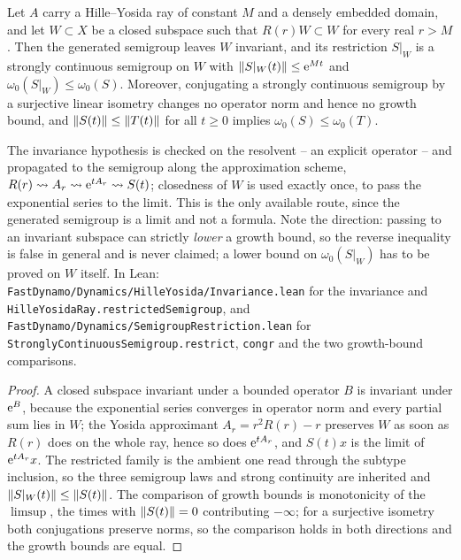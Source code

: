 \begin{lemma}
  \label{lem:dynamics:invariant-restriction}
  \leanok
  Let $A $ carry a Hille--Yosida ray of constant $M $ and a densely embedded domain, and let
  $W\subset X $ be a closed subspace such that $R(r)W\subset W $ for every real $r>M $.  Then
  the generated semigroup leaves $W $ invariant, and its restriction $S|_W $ is a strongly
  continuous semigroup on $W $ with $\left\|S|_W(t)\right\|\leq\mathrm{e}^{Mt} $ and
  $\omega_0(S|_W)\leq\omega_0(S) $.  Moreover, conjugating a strongly continuous semigroup by
  a surjective linear isometry changes no operator norm and hence no growth bound, and
  $\left\|S(t)\right\|\leq\left\|T(t)\right\| $ for all $t\geq0 $ implies $\omega_0(S)\leq\omega_0(T) $.
\end{lemma}

The invariance hypothesis is checked on the resolvent -- an explicit operator -- and
propagated to the semigroup along the approximation scheme,
$R(r)\rightsquigarrow A_r\rightsquigarrow\mathrm{e}^{tA_r}\rightsquigarrow S(t) $; closedness of $W $
is used exactly once, to pass the exponential series to the limit.  This is the only
available route, since the generated semigroup is a limit and not a formula.  Note the
direction: passing to an invariant subspace can strictly \emph{lower} a growth bound, so the
reverse inequality is false in general and is never claimed; a lower bound on
$\omega_0(S|_W) $ has to be proved on $W $ itself.  In Lean:
\texttt{FastDynamo/Dynamics/HilleYosida/Invariance.lean} for the invariance and
\texttt{HilleYosidaRay.restrictedSemigroup}, and
\texttt{FastDynamo/Dynamics/SemigroupRestriction.lean} for
\texttt{StronglyContinuousSemigroup.restrict}, \texttt{congr} and the two growth-bound
comparisons.

\begin{proof}
  \leanok
  A closed subspace invariant under a bounded operator $B $ is invariant under $\mathrm{e}^B $,
  because the exponential series converges in operator norm and every partial sum lies in
  $W $; the Yosida approximant $A_r=r^2R(r)-r $ preserves $W $ as soon as $R(r) $ does on the
  whole ray, hence so does $\mathrm{e}^{tA_r} $, and $S(t)x $ is the limit of $\mathrm{e}^{tA_r}x $.  The
  restricted family is the ambient one read through the subtype inclusion, so the three
  semigroup laws and strong continuity are inherited and $\left\|S|_W(t)\right\|\leq\left\|S(t)\right\| $.
  The comparison of growth bounds is monotonicity of the $\limsup $, the times with
  $\left\|S(t)\right\|=0 $ contributing $-\infty $; for a surjective isometry both conjugations
  preserve norms, so the comparison holds in both directions and the growth bounds are equal.
\end{proof}

